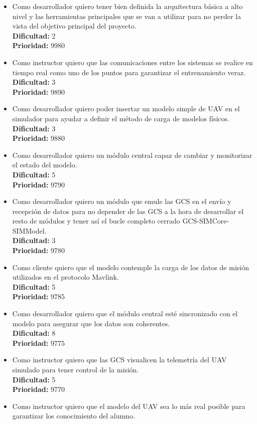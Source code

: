 \documentclass[12pt,a4paper,spanish]{book} %
\begin{document}
\begin{itemize}
\item Como desarrollador quiero tener bien definida la arquitectura básica a alto nivel y las herramientas principales que se van a utilizar para no perder la vista del objetivo principal del proyecto.
\\
\textbf{Dificultad: }2
\\
\textbf{Prioridad: }9980
\item Como instructor quiero que las comunicaciones entre los sistemas se realice en tiempo real como uno de los puntos para garantizar el entrenamiento veraz.
\\
\textbf{Dificultad: }3
\\
\textbf{Prioridad: }9890
\item Como desarrollador quiero poder insertar un modelo simple de UAV en el simulador para ayudar a definir el método de carga de modelos físicos.
\\
\textbf{Dificultad: }3
\\
\textbf{Prioridad: }9880
\item Como desarrollador quiero un módulo central capaz de cambiar y monitorizar el estado del modelo.
\\
\textbf{Dificultad: }5
\\
\textbf{Prioridad: }9790
\item Como desarrollador quiero un módulo que emule las GCS en el envío y recepción de datos para no depender de las GCS a la hora de desarrollar el resto de módulos y tener así el bucle completo cerrado GCS-SIMCore-SIMModel.
\\
\textbf{Dificultad: }3
\\
\textbf{Prioridad: }9780
\item Como cliente quiero que el modelo contemple la carga de los datos de misión utilizados en el protocolo Mavlink.
\\
\textbf{Dificultad: }5
\\
\textbf{Prioridad: }9785
\item Como desarrollador quiero que el módulo central esté sincronizado con el modelo para asegurar que los datos son coherentes.
\\
\textbf{Dificultad: }8
\\
\textbf{Prioridad: }9775
\item Como instructor quiero que las GCS visualicen la telemetría del UAV simulado para tener control de la misión.
\\
\textbf{Dificultad: }5
\\
\textbf{Prioridad: }9770
\item Como instructor quiero que el modelo del UAV sea lo más real posible para garantizar los conocimiento del alumno.

\end{itemize}
\end{document}
